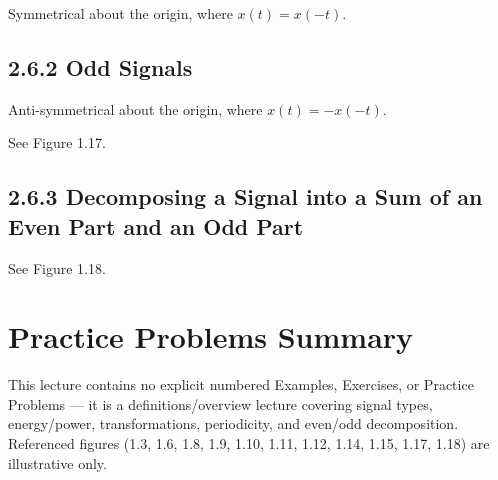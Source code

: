 \documentclass[11pt]{article}
\begin{document}
Symmetrical about the origin, where $x(t) = x(-t)$.

\subsection*{2.6.2 Odd Signals}

Anti-symmetrical about the origin, where $x(t) = -x(-t)$.

See Figure 1.17.

\subsection*{2.6.3 Decomposing a Signal into a Sum of an Even Part and an Odd Part}

See Figure 1.18.

\section*{Practice Problems Summary}

This lecture contains no explicit numbered Examples, Exercises, or Practice Problems — it is a definitions/overview lecture covering signal types, energy/power, transformations, periodicity, and even/odd decomposition. Referenced figures (1.3, 1.6, 1.8, 1.9, 1.10, 1.11, 1.12, 1.14, 1.15, 1.17, 1.18) are illustrative only.
\end{document}

